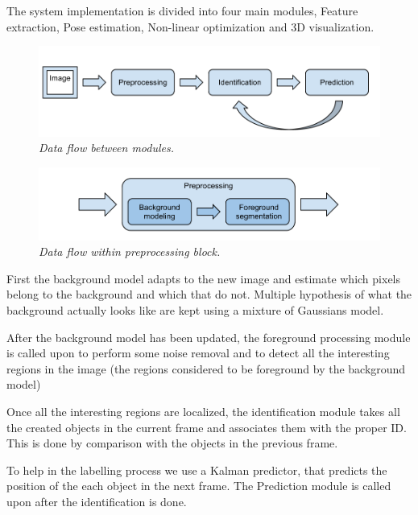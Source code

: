 The system implementation is divided into four main modules, Feature extraction, Pose estimation, Non-linear optimization and 3D visualization.


\begin{figure}[htb]
	\centering
	\includegraphics[width=\linewidth]{images/data_flow.png}
	\caption{\textit{Data flow between modules.}}
	\label{fig:block_overview_fig}  %
\end{figure}

\begin{figure}[htb]
	\centering
	\includegraphics[width=\linewidth]{images/data_flow_preprocessing.png}
	\caption{\textit{Data flow within preprocessing block.}}
	\label{fig:block_overview2_fig}  %
\end{figure}


First the background model adapts to the new image and estimate which pixels belong to the background and which that do not. Multiple hypothesis of what the background actually looks like are kept using a mixture of Gaussians model.

After the background model has been updated, the foreground processing module is called upon to perform some noise removal and to detect all the interesting regions in the image (the regions considered to be foreground by the background model)

Once all the interesting regions are localized, the identification module takes all the created objects in the current frame and associates them with the proper ID. This is done by comparison with the objects in the previous frame.

To help in the labelling process we use a Kalman predictor, that predicts the position of the each object in the next frame. The Prediction module is called upon after the identification is done.